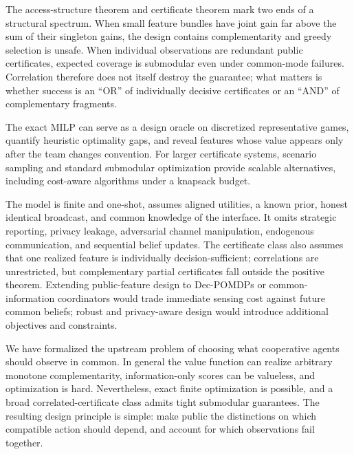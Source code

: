 The access-structure theorem and certificate theorem mark two ends of a structural spectrum. When small feature bundles have joint gain far above the sum of their singleton gains, the design contains complementarity and greedy selection is unsafe. When individual observations are redundant public certificates, expected coverage is submodular even under common-mode failures. Correlation therefore does not itself destroy the guarantee; what matters is whether success is an ``OR'' of individually decisive certificates or an ``AND'' of complementary fragments.

The exact MILP can serve as a design oracle on discretized representative games, quantify heuristic optimality gaps, and reveal features whose value appears only after the team changes convention. For larger certificate systems, scenario sampling and standard submodular optimization provide scalable alternatives, including cost-aware algorithms under a knapsack budget.

The model is finite and one-shot, assumes aligned utilities, a known prior, honest identical broadcast, and common knowledge of the interface. It omits strategic reporting, privacy leakage, adversarial channel manipulation, endogenous communication, and sequential belief updates. The certificate class also assumes that one realized feature is individually decision-sufficient; correlations are unrestricted, but complementary partial certificates fall outside the positive theorem. Extending public-feature design to Dec-POMDPs or common-information coordinators would trade immediate sensing cost against future common beliefs; robust and privacy-aware design would introduce additional objectives and constraints.

We have formalized the upstream problem of choosing what cooperative agents should observe in common. In general the value function can realize arbitrary monotone complementarity, information-only scores can be valueless, and optimization is hard. Nevertheless, exact finite optimization is possible, and a broad correlated-certificate class admits tight submodular guarantees. The resulting design principle is simple: make public the distinctions on which compatible action should depend, and account for which observations fail together.
